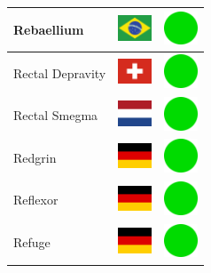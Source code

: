 \documentclass[12pt, a4paper, twoside]{report}
\begin{document}
\begin{center}
\begin{longtable}{|p{5cm}|p{2cm}|p{2cm}|}
 Rebaellium                                                 & \includegraphics[width=1cm]{../img/flags/br} &   \includegraphics[width=1cm]{../likes/y} \\ \hline
 Rectal Depravity                                           & \includegraphics[width=1cm]{../img/flags/ch} &   \includegraphics[width=1cm]{../likes/y} \\ \hline
 Rectal Smegma                                              & \includegraphics[width=1cm]{../img/flags/nl} &   \includegraphics[width=1cm]{../likes/y} \\ \hline
 Redgrin                                                    & \includegraphics[width=1cm]{../img/flags/de} &   \includegraphics[width=1cm]{../likes/y} \\ \hline
 Reflexor                                                   & \includegraphics[width=1cm]{../img/flags/de} &   \includegraphics[width=1cm]{../likes/y} \\ \hline
 Refuge                                                     & \includegraphics[width=1cm]{../img/flags/de} &   \includegraphics[width=1cm]{../likes/y} \\ \hline

\end{longtable}
\end{center}
\end{document}
